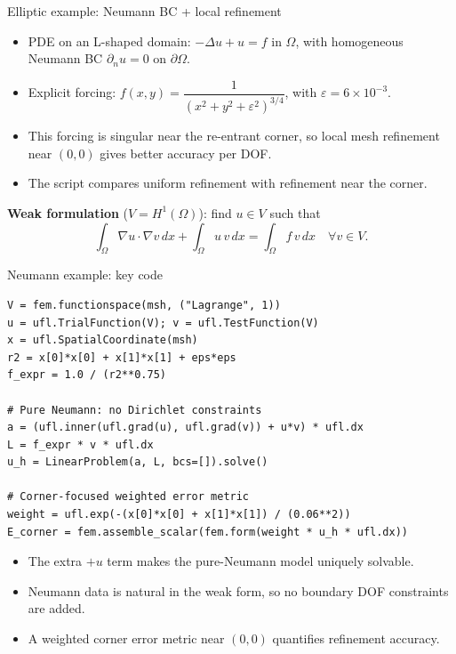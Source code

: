 \documentclass[aspectratio=169, 11pt]{beamer}
\begin{document}
\begin{frame}{Elliptic example: Neumann BC + local refinement}

\begin{itemize}
\footnotesize
\item PDE on an L-shaped domain:
      $-\Delta u + u = f$ in $\Omega$, with homogeneous Neumann BC
      $\partial_n u = 0$ on $\partial\Omega$.
\item Explicit forcing:
    $f(x,y)=\dfrac{1}{\left(x^2+y^2+\varepsilon^2\right)^{3/4}}$, with
    $\varepsilon=6\times10^{-3}$.
\item This forcing is singular near the re-entrant corner,
      so local mesh refinement near $(0,0)$ gives better accuracy per DOF.
\item The script compares uniform refinement with refinement near the corner.
\end{itemize}

\medskip
\footnotesize
\textbf{Weak formulation} ($V = H^1(\Omega)$): find $u \in V$ such that
\[
\int_{\Omega} \nabla u \cdot \nabla v\,dx + \int_{\Omega} u\,v\,dx
= \int_{\Omega} f\,v\,dx
\quad \forall v \in V.
\]

\end{frame}

\begin{frame}[fragile]{Neumann example: key code}

\begin{lstlisting}[basicstyle=\ttfamily\tiny]
V = fem.functionspace(msh, ("Lagrange", 1))
u = ufl.TrialFunction(V); v = ufl.TestFunction(V)
x = ufl.SpatialCoordinate(msh)
r2 = x[0]*x[0] + x[1]*x[1] + eps*eps
f_expr = 1.0 / (r2**0.75)

# Pure Neumann: no Dirichlet constraints
a = (ufl.inner(ufl.grad(u), ufl.grad(v)) + u*v) * ufl.dx
L = f_expr * v * ufl.dx
u_h = LinearProblem(a, L, bcs=[]).solve()

# Corner-focused weighted error metric
weight = ufl.exp(-(x[0]*x[0] + x[1]*x[1]) / (0.06**2))
E_corner = fem.assemble_scalar(fem.form(weight * u_h * ufl.dx))
\end{lstlisting}

\medskip
\begin{itemize}
\small
\item The extra $+u$ term makes the pure-Neumann model uniquely solvable.
\item Neumann data is natural in the weak form, so no boundary DOF constraints are added.
\item A weighted corner error metric near $(0,0)$ quantifies refinement accuracy.
\end{itemize}

\end{frame}
\end{document}
